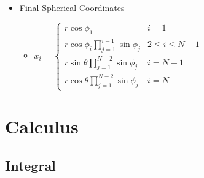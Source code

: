 \begin{itemize}
\begin{itemize}
\begin{itemize}
		$\Rightarrow$ define $\theta \in [0,2\pi)$ instead of $\phi_{N-1}, \phi_N\in[0,\pi]$ \\
		$\displaystyle \Rightarrow x_{N-1} = r_{N-1}\sin\theta, x_{N} = r_{N-1}\cos\theta$ (interchangeable)
		\end{itemize}
	\item Final Spherical Coordinates
		\begin{itemize}
		\item $x_i = \begin{cases} r\cos\phi_1 & i = 1 \\ \displaystyle r\cos\phi_i\prod_{j=1}^{i-1}\sin\phi_j & 2\le i \le N-1 \\ \displaystyle r\sin\theta\prod_{j=1}^{N-2}\sin\phi_j & i=N-1 \\ \displaystyle r\cos\theta\prod_{j=1}^{N-2}\sin\phi_j & i=N \end{cases}$
		\end{itemize}
	\end{itemize}

\end{itemize}
 
\section{Calculus}

\subsection{Integral}
